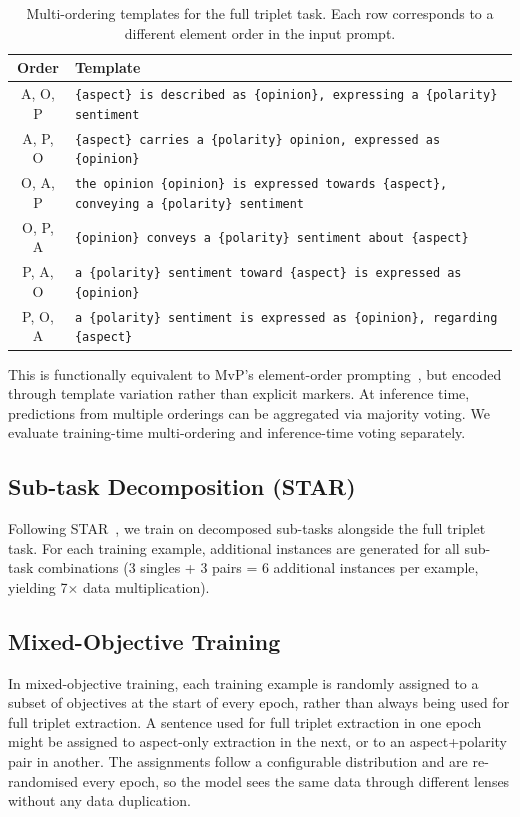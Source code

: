 \documentclass[12pt,a4paper]{report}
\begin{document}
\begin{table}[H]
\centering
\caption{Multi-ordering templates for the full triplet task. Each row corresponds to a different element order in the input prompt.}
\label{tab:orderings}
\small
\begin{tabular}{@{}cp{12.5cm}@{}}
\toprule
\textbf{Order} & \textbf{Template} \\
\midrule
A, O, P & \texttt{\{aspect\} is described as \{opinion\}, expressing a \{polarity\} sentiment} \\
A, P, O & \texttt{\{aspect\} carries a \{polarity\} opinion, expressed as \{opinion\}} \\
O, A, P & \texttt{the opinion \{opinion\} is expressed towards \{aspect\}, conveying a \{polarity\} sentiment} \\
O, P, A & \texttt{\{opinion\} conveys a \{polarity\} sentiment about \{aspect\}} \\
P, A, O & \texttt{a \{polarity\} sentiment toward \{aspect\} is expressed as \{opinion\}} \\
P, O, A & \texttt{a \{polarity\} sentiment is expressed as \{opinion\}, regarding \{aspect\}} \\
\bottomrule
\end{tabular}
\end{table}

This is functionally equivalent to MvP's element-order prompting~\cite{gou2023mvp}, but encoded through template variation rather than explicit markers. At inference time, predictions from multiple orderings can be aggregated via majority voting. We evaluate training-time multi-ordering and inference-time voting separately.

\subsection{Sub-task Decomposition (STAR)}

Following STAR~\cite{xie2025star}, we train on decomposed sub-tasks alongside the full triplet task. For each training example, additional instances are generated for all sub-task combinations (3 singles + 3 pairs = 6 additional instances per example, yielding 7$\times$ data multiplication).

\subsection{Mixed-Objective Training}

In mixed-objective training, each training example is randomly assigned to a subset of objectives at the start of every epoch, rather than always being used for full triplet extraction. A sentence used for full triplet extraction in one epoch might be assigned to aspect-only extraction in the next, or to an aspect+polarity pair in another. The assignments follow a configurable distribution and are re-randomised every epoch, so the model sees the same data through different lenses without any data duplication.
\end{document}
